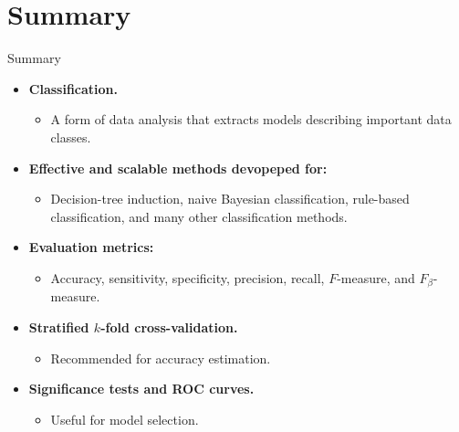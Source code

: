 \section{Summary}

\begin{frame}{Summary}
  \begin{itemize}
  \item \textbf{Classification.}
    \begin{itemize}
    \item A form of data analysis that extracts models describing important data classes.
    \end{itemize}
  \item \textbf{Effective and scalable methods devopeped for:}
    \begin{itemize}
    \item Decision-tree induction, naive Bayesian classification, rule-based classification, and many other classification methods.
    \end{itemize}
  \item \textbf{Evaluation metrics:}
    \begin{itemize}
    \item Accuracy, sensitivity, specificity, precision, recall, $F$-measure, and $F_\beta$-measure.
    \end{itemize}
  \item \textbf{Stratified $k$-fold cross-validation.}
    \begin{itemize}
    \item Recommended for accuracy estimation.
    \end{itemize}
  \item \textbf{Significance tests and ROC curves.}
    \begin{itemize}
    \item Useful for model selection.
    \end{itemize}
  \end{itemize}
\end{frame}